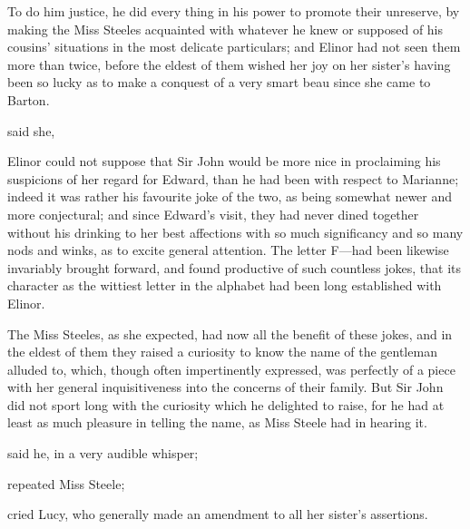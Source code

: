To do him justice, he did every thing in his power to promote their unreserve, by making the Miss Steeles acquainted with whatever he knew or supposed of his cousins' situations in the most delicate particulars; and Elinor had not seen them more than twice, before the eldest of them wished her joy on her sister's having been so lucky as to make a conquest of a very smart beau since she came to Barton.

 said she, 

Elinor could not suppose that Sir John would be more nice in proclaiming his suspicions of her regard for Edward, than he had been with respect to Marianne; indeed it was rather his favourite joke of the two, as being somewhat newer and more conjectural; and since Edward's visit, they had never dined together without his drinking to her best affections with so much significancy and so many nods and winks, as to excite general attention. The letter F---had been likewise invariably brought forward, and found productive of such countless jokes, that its character as the wittiest letter in the alphabet had been long established with Elinor.

The Miss Steeles, as she expected, had now all the benefit of these jokes, and in the eldest of them they raised a curiosity to know the name of the gentleman alluded to, which, though often impertinently expressed, was perfectly of a piece with her general inquisitiveness into the concerns of their family. But Sir John did not sport long with the curiosity which he delighted to raise, for he had at least as much pleasure in telling the name, as Miss Steele had in hearing it.

 said he, in a very audible whisper; 

 repeated Miss Steele; 

 cried Lucy, who generally made an amendment to all her sister's assertions. 

